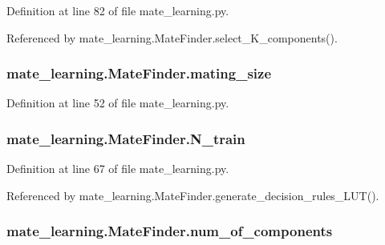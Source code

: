 Definition at line 82 of file mate\+\_\+learning.\+py.



Referenced by mate\+\_\+learning.\+Mate\+Finder.\+select\+\_\+\+K\+\_\+components().

\hypertarget{classmate__learning_1_1_mate_finder_ac9e474a0c97351549960cd8baf0bbe24}{
\subsubsection[{mating\+\_\+size}]{\setlength{\rightskip}{0pt plus 5cm}mate\+\_\+learning.\+Mate\+Finder.\+mating\+\_\+size}}\label{classmate__learning_1_1_mate_finder_ac9e474a0c97351549960cd8baf0bbe24}


Definition at line 52 of file mate\+\_\+learning.\+py.

\hypertarget{classmate__learning_1_1_mate_finder_ad1790fa1f3465a0986165e11474723e2}{
\subsubsection[{N\+\_\+train}]{\setlength{\rightskip}{0pt plus 5cm}mate\+\_\+learning.\+Mate\+Finder.\+N\+\_\+train}}\label{classmate__learning_1_1_mate_finder_ad1790fa1f3465a0986165e11474723e2}


Definition at line 67 of file mate\+\_\+learning.\+py.



Referenced by mate\+\_\+learning.\+Mate\+Finder.\+generate\+\_\+decision\+\_\+rules\+\_\+\+L\+U\+T().

\hypertarget{classmate__learning_1_1_mate_finder_aaf6a72d379804901e89dc1c3e5ae5fd4}{
\subsubsection[{num\+\_\+of\+\_\+components}]{\setlength{\rightskip}{0pt plus 5cm}mate\+\_\+learning.\+Mate\+Finder.\+num\+\_\+of\+\_\+components}}\label{classmate__learning_1_1_mate_finder_aaf6a72d379804901e89dc1c3e5ae5fd4}


